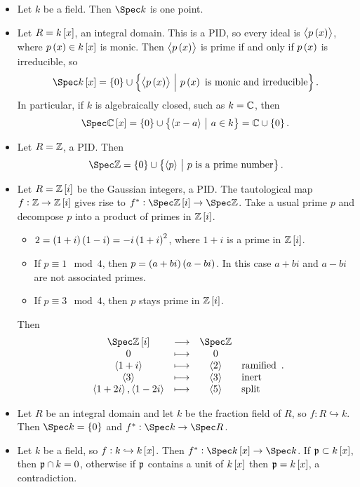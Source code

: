 \begin{example*}
\hfill
\begin{itemize}
\item Let $ k $ be a field. Then $ \Spec k $ is one point.
\item Let $ R = k\sbr{x} $, an integral domain. This is a PID, so every ideal is $ \abr{p\br{x}} $, where $ p\br{x} \in k\sbr{x} $ is monic. Then $ \abr{p\br{x}} $ is prime if and only if $ p\br{x} $ is irreducible, so
$$ \Spec k\sbr{x} = \cbr{0} \cup \cbr{\abr{p\br{x}} \st p\br{x} \ \text{is monic and irreducible}}. $$
In particular, if $ k $ is algebraically closed, such as $ k = \mathbb{C} $, then
$$ \Spec \CC\sbr{x} = \cbr{0} \cup \cbr{\abr{x - a} \st a \in k} = \CC \cup \cbr{0}. $$
\item Let $ R = \mathbb{Z} $, a PID. Then
$$ \Spec \ZZ = \cbr{0} \cup \cbr{\abr{p} \st p \ \text{is a prime number}}. $$
\item Let $ R = \ZZ\sbr{i} $ be the Gaussian integers, a PID. The tautological map $ f : \ZZ \to \ZZ\sbr{i} $ gives rise to $ f^* : \Spec \ZZ\sbr{i} \to \Spec \ZZ $. Take a usual prime $ p $ and decompose $ p $ into a product of primes in $ \ZZ\sbr{i} $.
\begin{itemize}
\item $ 2 = \br{1 + i}\br{1 - i} = -i\br{1 + i}^2 $, where $ 1 + i $ is a prime in $ \ZZ\sbr{i} $.
\item If $ p \equiv 1 \mod 4 $, then $ p = \br{a + bi}\br{a - bi} $. In this case $ a + bi $ and $ a - bi $ are not associated primes.
\item If $ p \equiv 3 \mod 4 $, then $ p $ stays prime in $ \ZZ\sbr{i} $.
\end{itemize}
Then
$$
\begin{array}{cccl}
\Spec \ZZ\sbr{i} & \longrightarrow & \Spec \ZZ & \\
0 & \longmapsto & 0 & \\
\abr{1 + i} & \longmapsto & \abr{2} & \text{ramified} \\
\abr{3} & \longmapsto & \abr{3} & \text{inert} \\
\abr{1 + 2i}, \abr{1 - 2i} & \longmapsto & \abr{5} & \text{split}
\end{array}.
$$
\item Let $ R $ be an integral domain and let $ k $ be the fraction field of $ R $, so $ f : R \hookrightarrow k $. Then $ \Spec k = \cbr{0} $ and $ f^* : \Spec k \to \Spec R $.
\item Let $ k $ be a field, so $ f : k \hookrightarrow k\sbr{x} $. Then $ f^* : \Spec k\sbr{x} \to \Spec k $. If $ \ppp \subset k\sbr{x} $, then $ \mathfrak{p} \cap k = 0 $, otherwise if $ \mathfrak{p} $ contains a unit of $ k\sbr{x} $ then $ \ppp = k\sbr{x} $, a contradiction.
\end{itemize}
\end{example*}

